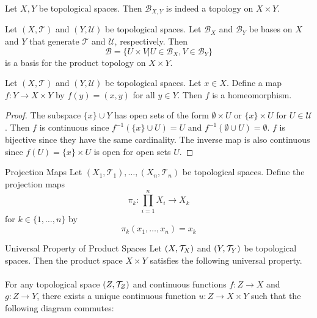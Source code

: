 \documentclass[a4paper]{article}
\begin{document}
\begin{lmm}{}{} Let $X,Y$ be topological spaces. Then $\mathcal{B}_{X,Y}$ is indeed a topology on $X\times Y$. 
\end{lmm}

\begin{prp}{}{} Let $(X,\mathcal{T})$ and $(Y,\mathcal{U})$ be topological spaces. Let $\mathcal{B}_X$ and $\mathcal{B}_Y$ be bases on $X$ and $Y$ that generate $\mathcal{T}$ and $\mathcal{U}$, respectively. Then $$\mathcal{B}=\{U\times V|U\in\mathcal{B}_X, V\in\mathcal{B}_Y\}$$ is a basis for the product topology on $X\times Y$. 
\end{prp}

\begin{prp}{}{} Let $(X,\mathcal{T})$ and $(Y,\mathcal{U})$ be topological spaces. Let $x\in X$. Define a map $f:Y\to X\times Y$ by $f(y)=(x,y)$ for all $y\in Y$. Then $f$ is a homeomorphism. \tcbline
\begin{proof}
The subspace $\{x\}\cup Y$ has open sets of the form $\emptyset\times U$ or $\{x\}\times U$ for $U\in\mathcal{U}$. Then $f$ is continuous since $f^{-1}(\{x\}\cup U)=U$ and $f^{-1}(\emptyset\cup U)=\emptyset$. $f$ is bijective since they have the same cardinality. The inverse map is also continuous since $f(U)=\{x\}\times U$ is open for open sets $U$. 
\end{proof}
\end{prp}

\begin{defn}{Projection Maps}{} Let $(X_1,\mathcal{T}_1),\dots,(X_n,\mathcal{T}_n)$ be topological spaces. Define the projection maps $$\pi_k:\prod_{i=1}^nX_i\to X_k$$ for $k\in\{1,\dots,n\}$ by $$\pi_k(x_1,\dots,x_n)=x_k$$
\end{defn}

\begin{prp}{Universal Property of Product Spaces}{} Let $(X,\mathcal{T}_X)$ and $(Y,\mathcal{T}_Y)$ be topological spaces. Then the product space $X\times Y$ satisfies the following universal property. \\~\\

For any topological space $(Z,\mathcal{T}_Z)$ and continuous functions $f:Z\to X$ and $g:Z\to Y$, there exists a unique continuous function $u:Z\to X\times Y$ such that the following diagram commutes: \\~\\
 \\~\\
\end{prp}
\end{document}
